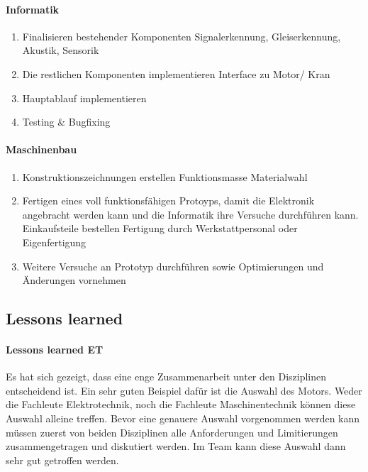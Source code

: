 \documentclass[../../main.tex]{subfiles}
\begin{document}
\paragraph{Informatik}
\begin{enumerate}
    \item Finalisieren bestehender Komponenten
        \subitem Signalerkennung, Gleiserkennung, Akustik, Sensorik
    \item Die restlichen Komponenten implementieren
        \subitem Interface zu Motor/ Kran
    \item Hauptablauf implementieren
    \item Testing \& Bugfixing
\end{enumerate}

\paragraph{Maschinenbau}
\begin{enumerate}
    \item Konstruktionszeichnungen erstellen
    \subitem Funktionsmasse
    \subitem Materialwahl
    \item Fertigen eines voll funktionsfähigen Protoyps, damit die Elektronik angebracht werden kann und die Informatik ihre Versuche durchführen kann.
    \subitem Einkaufsteile bestellen
    \subitem Fertigung durch Werkstattpersonal oder Eigenfertigung
    \item Weitere Versuche an Prototyp durchführen sowie Optimierungen und Änderungen vornehmen
\end{enumerate}

\subsection{Lessons learned}

\paragraph{Lessons learned ET}
Es hat sich gezeigt, dass eine enge Zusammenarbeit unter den Disziplinen entscheidend ist. Ein sehr guten Beispiel dafür ist die Auswahl des Motors. Weder die Fachleute Elektrotechnik, noch die Fachleute Maschinentechnik können diese Auswahl alleine treffen. Bevor eine genauere Auswahl vorgenommen werden kann müssen zuerst von beiden Disziplinen alle Anforderungen und Limitierungen zusammengetragen und diskutiert werden. Im Team kann diese Auswahl dann sehr gut getroffen werden.
\end{document}
